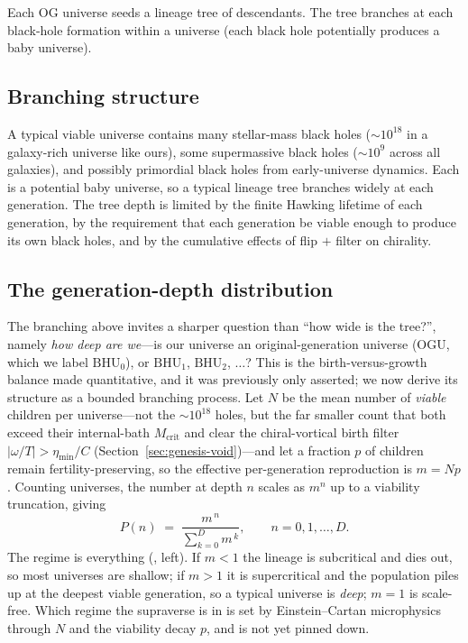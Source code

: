 Each OG universe seeds a lineage tree of descendants. The tree branches at each
black-hole formation within a universe (each black hole potentially produces a
baby universe).

\subsection{Branching structure}

A typical viable universe contains many stellar-mass black holes ($\sim 10^{18}$
in a galaxy-rich universe like ours), some supermassive black holes
($\sim 10^{9}$ across all galaxies), and possibly primordial black holes from
early-universe dynamics. Each is a potential baby universe, so a typical lineage
tree branches widely at each generation. The tree depth is limited by the finite
Hawking lifetime of each generation, by the requirement that each generation be
viable enough to produce its own black holes, and by the cumulative effects of
flip $+$ filter on chirality.

\subsection{The generation-depth distribution}
\label{sec:gendepth}

The branching above invites a sharper question than ``how wide is the tree?'',
namely \emph{how deep are we}---is our universe an original-generation universe
(OGU, which we label $\mathrm{BHU}_0$), or $\mathrm{BHU}_1$, $\mathrm{BHU}_2$,
$\ldots$? This is the birth-versus-growth balance made quantitative, and it was
previously only asserted; we now derive its structure as a bounded branching
process. Let $N$ be the mean number of \emph{viable} children per universe---not
the $\sim10^{18}$ holes, but the far smaller count that both exceed their
internal-bath $M_{\mathrm{crit}}$ and clear the chiral-vortical birth filter
$|\omega/T|>\eta_{\min}/C$ (Section~\ref{sec:genesis-void})---and let a fraction
$p$ of children remain fertility-preserving, so the effective per-generation
reproduction is $m=Np$. Counting universes, the number at depth $n$ scales as
$m^n$ up to a viability truncation, giving
\begin{equation}
  P(n) \;=\; \frac{m^{\,n}}{\sum_{k=0}^{D} m^{\,k}}, \qquad n = 0,1,\dots,D.
  \label{eq:gendepth}
\end{equation}
The regime is everything (, left). If $m<1$ the lineage is
subcritical and dies out, so most universes are shallow; if $m>1$ it is
supercritical and the population piles up at the deepest viable generation, so a
typical universe is \emph{deep}; $m=1$ is scale-free. Which regime the supraverse
is in is set by Einstein--Cartan microphysics through $N$ and the viability decay
$p$, and is not yet pinned down.

